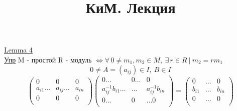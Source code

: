 \documentclass[a4paper]{article}
\begin{document}
\title{КиМ. Лекция}
\maketitle

\begin{tcolorbox}
\underline{Lemma 4}\\
\underline{Упр} M - простой R - модуль $ \iff \forall \, 0 \neq m_1, m_2 \in M, 
\ \exists \, r \in R \ | \ m_2 = r m_1$ 
\[
    0 \neq A = (a_{ij}) \in I, \ B \in I
\]
\[
    \begin{pmatrix}
    0 & 0 & 0\\
    a_{i 1} \dots & a_{ij}\dots & a_{in}\\
    0 & 0 & 0\\
    
    \end{pmatrix}
    \begin{pmatrix}
    0 \dots & 0\dots & 0\\
    a_{ij}^{-1}b_{i 1}\dots & \dots & a_{ij}^{-1}b_{in}\\
    0 \dots &  0 & \dots 0\\
    
    \end{pmatrix}
    = 
    \begin{pmatrix}
    0 & \dots & 0\\
    b_{i 1} & \dots & b_{in}\\
    0 & \dots & 0\\
    
    \end{pmatrix}
\]
\end{tcolorbox}
\end{document}
